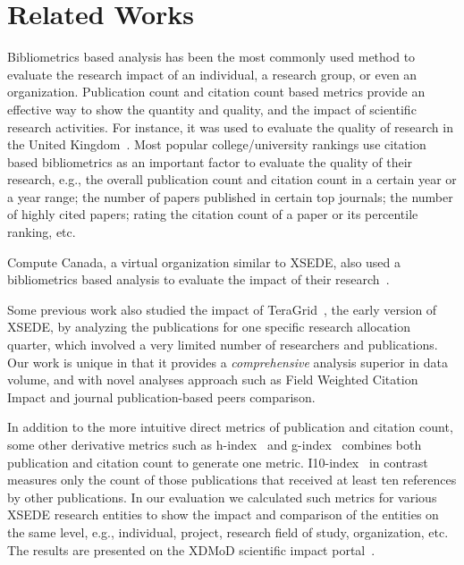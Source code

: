 \documentclass{sig-alternate}
\begin{document}
\section{Related Works} \label{S:related}

Bibliometrics based analysis has been the most commonly used method to
evaluate the research impact of an individual, a research group, or
even an organization. Publication count and citation count based
metrics provide an effective way to show the quantity and quality, and
the impact of scientific research activities. For instance, it was
used to evaluate the quality of research in the United
Kingdom~\cite{thomas1998institutional,penfield2014assessment}. Most
popular college/university rankings use citation based bibliometrics
as an important factor to evaluate the quality of their research,
e.g., the overall publication count and citation count in a certain
year or a year range; the number of papers published in certain top
journals; the number of highly cited papers; rating the citation count
of a paper or its percentile ranking, etc.

Compute Canada, a virtual organization similar to XSEDE, also used a
bibliometrics based analysis to evaluate the impact of their
research~\cite{www-computecanada}.

Some previous work also studied the impact of
TeraGrid~\cite{bollen2011and}, the early version of XSEDE, by
analyzing the publications for one specific research allocation
quarter, which involved a very limited number of researchers and
publications. Our work is unique in that it provides a {\em
  comprehensive} analysis superior in data volume, and with novel
analyses approach such as Field Weighted Citation Impact and journal
publication-based peers comparison.

In addition to the more intuitive direct metrics of publication and
citation count, some other derivative metrics such as
h-index~\cite{hirsch2005index} and g-index~\cite{egghe2006theory}
combines both publication and citation count to generate one
metric. I10-index~\cite {www-i10index} in contrast measures only the
count of those publications that received at least ten references by
other publications.  In our evaluation we calculated such metrics for
various XSEDE research entities to show the impact and comparison of
the entities on the same level, e.g., individual, project, research
field of study, organization, etc. The results are presented on the
XDMoD scientific impact portal~\cite{www-xdmod-sciimp}.
\end{document}
